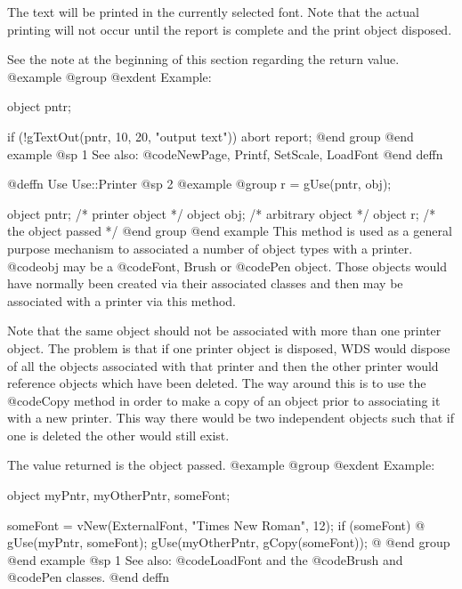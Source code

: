 The text will be printed in the currently selected font.  Note that the
actual printing will not occur until the report is complete and the
print object disposed.

See the note at the beginning of this section regarding the return value.
@example
@group
@exdent Example:

object  pntr;

if (!gTextOut(pntr, 10, 20, "output text"))
        abort report;
@end group
@end example
@sp 1
See also:  @code{NewPage, Printf, SetScale, LoadFont}
@end deffn







@deffn {Use} Use::Printer
@sp 2
@example
@group
r = gUse(pntr, obj);

object  pntr;   /*  printer object     */
object  obj;    /*  arbitrary object   */
object  r;      /*  the object passed  */
@end group
@end example
This method is used as a general purpose mechanism to associated a
number of object types with a printer.  @code{obj} may be a @code{Font,
Brush} or @code{Pen} object.  Those objects would have normally been
created via their associated classes and then may be associated with a
printer via this method.

Note that the same object should not be associated with more than one
printer object.  The problem is that if one printer object is disposed, WDS
would dispose of all the objects associated with that printer and then the
other printer would reference objects which have been deleted.  The way
around this is to use the @code{Copy} method in order to make a copy of
an object prior to associating it with a new printer.  This way there would
be two independent objects such that if one is deleted the other would
still exist.

The value returned is the object passed.
@example
@group
@exdent Example:

object  myPntr, myOtherPntr, someFont;

someFont = vNew(ExternalFont, "Times New Roman", 12);
if (someFont)  @{
        gUse(myPntr, someFont);
        gUse(myOtherPntr, gCopy(someFont));
@}
@end group
@end example
@sp 1
See also:  @code{LoadFont} and the @code{Brush} and @code{Pen} classes.
@end deffn












